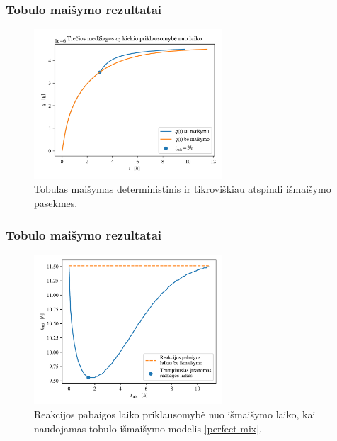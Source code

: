 \documentclass{beamer}
\begin{document}
\begin{frame}
\frametitle{Tobulo maišymo rezultatai}
\begin{figure}
\centering
\includegraphics[width=7cm]{paper/assets/optimal-mix-qnt-1.png}
\caption{Tobulas maišymas deterministinis ir tikroviškiau atspindi išmaišymo pasekmes.}
\end{figure}
\end{frame}

\begin{frame}
    \frametitle{Tobulo maišymo rezultatai}
    \begin{figure}
        \centering
        \includegraphics[width=7cm]{paper/assets/mix-end-1.png}
        \caption{Reakcijos pabaigos laiko priklausomybė nuo išmaišymo laiko, kai naudojamas tobulo išmaišymo modelis \eqref{perfect-mix}.}
    \end{figure}
\end{frame}
\end{document}
